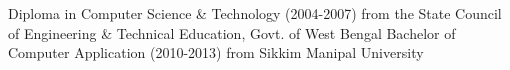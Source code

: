 %
%
%


\begin{scholarship}
					{Diploma in Computer Science \& Technology (2004-2007) from the State Council of Engineering \& Technical Education, Govt. of West Bengal}
					{Bachelor of Computer Application (2010-2013) from Sikkim Manipal University}
             
\end{scholarship}